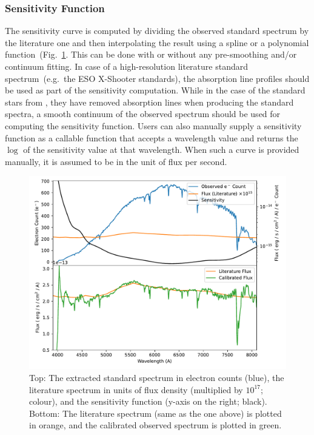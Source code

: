\documentclass[twocolumn, linenumbers]{aastex631}
\begin{document}
\subsubsection*{Sensitivity Function}
The sensitivity curve is computed by dividing the observed standard spectrum by
the literature one and then interpolating the result using a spline or a
polynomial function~(Fig.~\ref{fig:fluxcal}. This can be done with or without
any pre-smoothing and/or continuum fitting. In case of a high-resolution
literature standard spectrum~(e.g.\ the ESO X-Shooter standards), the
absorption line profiles should be used as part of the sensitivity computation.
While in the case of the standard stars from \citep{1990AJ.....99.1621O},
they have removed absorption lines when producing the standard spectra, a
smooth continuum of the observed spectrum should be used for computing
the sensitivity function. Users can also manually supply a sensitivity function
as a callable function that accepts a wavelength value and returns the $\log$
of the sensitivity value at that wavelength. When such a curve is provided
manually, it is assumed to be in the unit of flux per second.

\begin{figure}
    \centering
    \includegraphics[width=\columnwidth]{fig_06_flux_calibration_diagnostics.pdf}
    \caption{Top: The extracted standard spectrum in electron counts
    (blue), the literature spectrum in units of flux density (multiplied
    by $10^{17}$; colour), and the sensitivity function (y-axis on the right; black).
    Bottom: The literature spectrum (same as the one above) is plotted
    in orange, and the calibrated observed spectrum is plotted in green.}
    \label{fig:fluxcal}
\end{figure}
\end{document}
